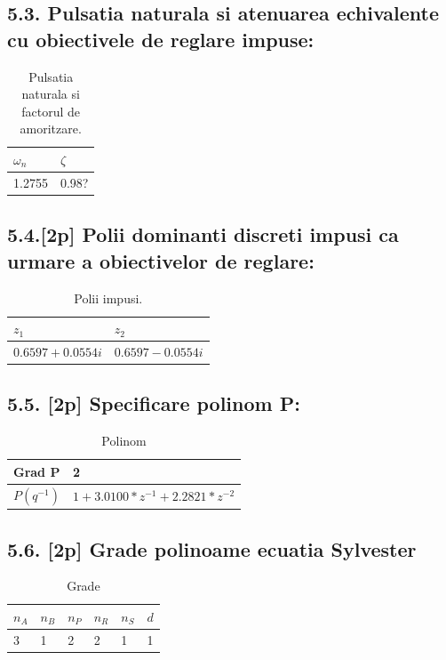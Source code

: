 \documentclass[12pt,english]{article}
\begin{document}
\subsection {5.3. Pulsatia naturala si atenuarea echivalente cu obiectivele de reglare impuse: }
\begin{table}[H]
  \centering
    \begin{tabular}{|l|l|}
      \hline
      $\omega_n$ & $\zeta$ \\
      \hline
      1.2755 & 0.98? \\
      \hline
    \end{tabular}
    \caption{Pulsatia naturala si factorul de amoritzare.}
\end{table}

\subsection {5.4.[2p] Polii dominanti discreti impusi ca urmare a obiectivelor de reglare: }
\begin{table}[H]
  \centering
    \begin{tabular}{|l|l|}
      \hline
      $z_1$ & $z_2$ \\
      \hline
      $0.6597 + 0.0554i$ & $0.6597 - 0.0554i$ \\
      \hline
    \end{tabular}
    \caption{Polii impusi.}
\end{table}

\subsection {5.5. [2p] Specificare polinom P: }
\begin{table}[H]
  \centering
    \begin{tabular}{|l|l|}
      \hline
      Grad P & 2 \\
      \hline
      $P(q^{-1})$ & $1 + 3.0100*z^{-1} + 2.2821*z^{-2}$ \\
      \hline
    \end{tabular}
    \caption{Polinom}
\end{table}

\subsection {5.6. [2p] Grade polinoame ecuatia Sylvester }
\begin{table}[H]
  \centering
    \begin{tabular}{|l|l|l|l|l|l|}
      \hline
      $n_A$ & $n_B$ & $n_P$ & $n_R$ & $n_S$ & $d$ \\
      \hline
      3 & 1 & 2 & 2 & 1 & 1 \\
      \hline
    \end{tabular}
    \caption{Grade}
\end{table}
\end{document}
